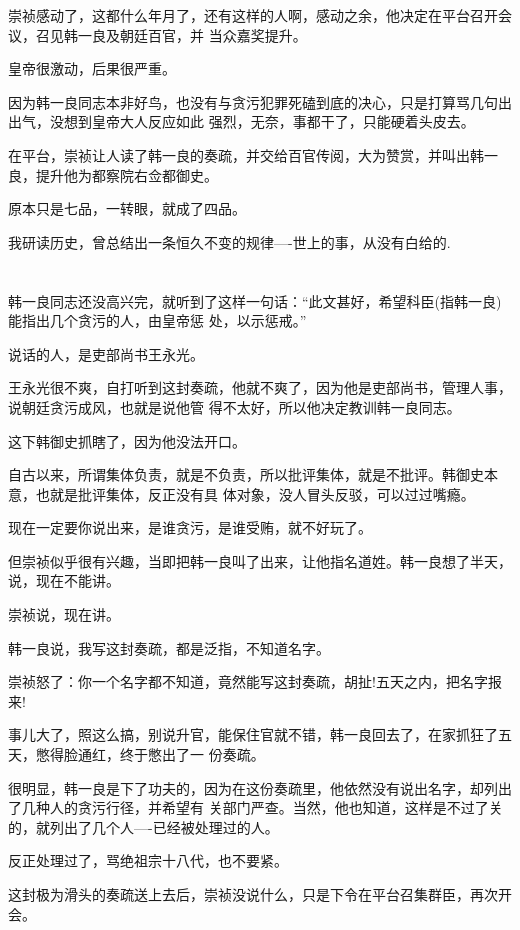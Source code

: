 \documentclass[11pt,a4paper,onecolumn]{article}
\begin{document}
崇祯感动了，这都什么年月了，还有这样的人啊，感动之余，他决定在平台召开会议，召见韩一良及朝廷百官，并
当众嘉奖提升。

皇帝很激动，后果很严重。

因为韩一良同志本非好鸟，也没有与贪污犯罪死磕到底的决心，只是打算骂几句出出气，没想到皇帝大人反应如此
强烈，无奈，事都干了，只能硬着头皮去。

在平台，崇祯让人读了韩一良的奏疏，并交给百官传阅，大为赞赏，并叫出韩一良，提升他为都察院右佥都御史。

原本只是七品，一转眼，就成了四品。

我研读历史，曾总结出一条恒久不变的规律----世上的事，从没有白给的.

\section[\thesection]{}

韩一良同志还没高兴完，就听到了这样一句话：``此文甚好，希望科臣(指韩一良)能指出几个贪污的人，由皇帝惩
处，以示惩戒。''

说话的人，是吏部尚书王永光。

王永光很不爽，自打听到这封奏疏，他就不爽了，因为他是吏部尚书，管理人事，说朝廷贪污成风，也就是说他管
得不太好，所以他决定教训韩一良同志。

这下韩御史抓瞎了，因为他没法开口。

自古以来，所谓集体负责，就是不负责，所以批评集体，就是不批评。韩御史本意，也就是批评集体，反正没有具
体对象，没人冒头反驳，可以过过嘴瘾。

现在一定要你说出来，是谁贪污，是谁受贿，就不好玩了。

但崇祯似乎很有兴趣，当即把韩一良叫了出来，让他指名道姓。韩一良想了半天，说，现在不能讲。

崇祯说，现在讲。

韩一良说，我写这封奏疏，都是泛指，不知道名字。

崇祯怒了：你一个名字都不知道，竟然能写这封奏疏，胡扯!五天之内，把名字报来!

事儿大了，照这么搞，别说升官，能保住官就不错，韩一良回去了，在家抓狂了五天，憋得脸通红，终于憋出了一
份奏疏。

很明显，韩一良是下了功夫的，因为在这份奏疏里，他依然没有说出名字，却列出了几种人的贪污行径，并希望有
关部门严查。当然，他也知道，这样是不过了关的，就列出了几个人----已经被处理过的人。

反正处理过了，骂绝祖宗十八代，也不要紧。

这封极为滑头的奏疏送上去后，崇祯没说什么，只是下令在平台召集群臣，再次开会。
\end{document}

